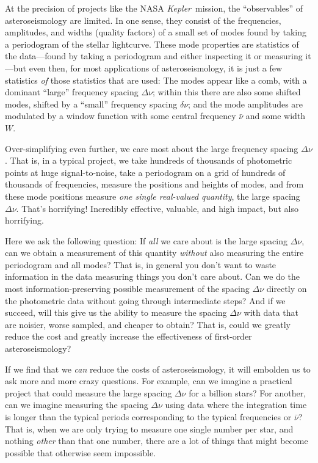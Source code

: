 \documentclass[12pt, letterpaper, preprint]{aastex}
\newcommand{\project}[1]{\textsl{#1}}
\newcommand{\kepler}{\project{Kepler}}
\newcommand{\frequency}{\nu}
\newcommand{\largedelta}{\Delta\frequency}
\newcommand{\smalldelta}{\delta\frequency}
\newcommand{\windowmean}{\bar{\frequency}}
\newcommand{\windowwidth}{W}
\begin{document}
At the precision of projects like the NASA \kepler\ mission,
the ``observables'' of asteroseismology are limited.
In one sense, they consist of the frequencies, amplitudes, and widths (quality factors)
of a small set of modes found by taking a periodogram of the stellar lightcurve.
These mode properties are statistics of the data---found by taking a periodogram
and either inspecting it or measuring it---but even then, for most applications of asteroseismology,
it is just a few statistics \emph{of} those statistics that are used:
The modes appear like a comb, with a dominant ``large'' frequency spacing $\largedelta$;
within this there are also some shifted modes, shifted by a ``small'' frequency spacing $\smalldelta$;
and the mode amplitudes are modulated by a window function with some central frequency $\windowmean$
and some width $\windowwidth$.

Over-simplifying even further, we care most about the large frequency spacing $\largedelta$.
That is, in a typical project, we take hundreds of thousands of photometric points at huge signal-to-noise,
take a periodogram on a grid of hundreds of thousands of frequencies,
measure the positions and heights of modes,
and from these mode positions measure \emph{one single real-valued quantity}, the large spacing $\largedelta$.
That's horrifying!
Incredibly effective, valuable, and high impact, but also horrifying.

Here we ask the following question:
If \emph{all} we care about is the large spacing $\largedelta$,
can we obtain a measurement of this quantity \emph{without} also measuring the entire periodogram and all modes?
That is, in general you don't want to waste information in the data measuring things you don't care about.
Can we do the most information-preserving possible measurement of the spacing $\largedelta$
directly on the photometric data without going through intermediate steps?
And if we succeed, will this give us the ability to measure the spacing $\largedelta$
with data that are noisier, worse sampled, and cheaper to obtain?
That is, could we greatly reduce the cost and greatly increase the effectiveness of
first-order asteroseismology?

If we find that we \emph{can} reduce the costs of asteroseismology,
it will embolden us to ask more and more crazy questions.
For example, can we imagine a practical project that could measure the large spacing $\largedelta$
for a billion stars?
For another, can we imagine measuring the spacing $\largedelta$ using data where the
integration time is longer than the typical periods corresponding to the typical frequencies or $\windowmean$?
That is, when we are only trying to measure one single number per star,
and nothing \emph{other} than that one number,
there are a lot of things that might become possible that otherwise seem impossible.
\end{document}
